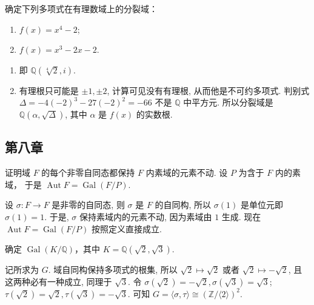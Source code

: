 \setcounter{pb}{10}
\begin{problem}
    确定下列多项式在有理数域上的分裂域：
    \begin{enumerate}[label=(\roman*)]
        \item $ f(x) = x^4 - 2 $;
        \item $ f(x) = x^3 - 2x - 2 $.
    \end{enumerate}
\end{problem}

\begin{solution}
\begin{enumerate}[label=(\roman*)]
    \item 即 $\mathbb{Q}(\sqrt[4]{2},i)$.
    \item 有理根只可能是 $\pm1,\pm2$, 计算可见没有有理根, 从而他是不可约多项式. 判别式 $\Delta=-4(-2)^3-27(-2)^2=-66$ 不是 $\mathbb{Q}$ 中平方元. 
    所以分裂域是 $\mathbb{Q}(\alpha,\sqrt{\Delta})$, 其中 $\alpha$ 是 $f(x)$ 的实数根.
\end{enumerate}
\end{solution}

\subsection{第八章}
\setcounter{pb}{2}
\begin{problem}
    证明域 $ F $ 的每个非零自同态都保持 $ F $ 内素域的元素不动. 设 $ P $ 为含于 $ F $ 内的素域， 于是 $ \operatorname{Aut} F = \operatorname{Gal}(F/P) $.
\end{problem}

\begin{solution}
    设 $\sigma\colon F\to F$ 是非零的自同态, 则 $\sigma$ 是 $F$ 的自同构, 
    所以 $\sigma(1)$ 是单位元即 $\sigma(1)=1$. 于是, $\sigma$ 保持素域内的元素不动, 因为素域由 $1$ 生成. 
    现在 $\operatorname{Aut}F=\operatorname{Gal}(F/P)$ 按照定义直接成立. 
\end{solution}

\setcounter{pb}{4}
\begin{problem}
    确定 $ \operatorname{Gal}(K/\mathbb{Q}) $，其中 $ K = \mathbb{Q}(\sqrt{2}, \sqrt{3}) $.
\end{problem}

\begin{solution}
    记所求为 $G$. 域自同构保持多项式的根集, 所以 $\sqrt{2}\mapsto\sqrt{2}$ 或者 $\sqrt{2}\mapsto-\sqrt{2}$, 且这两种必有一种成立, 同理于 $\sqrt{3}$. 
    令 $\sigma(\sqrt{2})=-\sqrt{2},\sigma(\sqrt{3})=\sqrt{3}$; $\tau(\sqrt{2})=\sqrt{2},\tau(\sqrt{3})=-\sqrt{3}$.
    可知 $G=\langle \sigma,\tau \rangle \cong (\mathbb{Z}/\langle 2 \rangle)^{2}$.
\end{solution}

